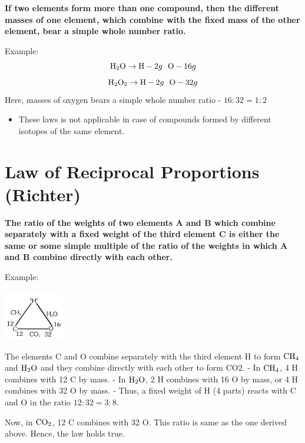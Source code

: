 \documentclass[
  14pt,
]{extarticle}
\providecommand{\tightlist}{%
  \setlength{\itemsep}{0pt}\setlength{\parskip}{0pt}}
\renewenvironment{quote}{\begin{myquote}}{\end{myquote}}
\begin{document}
\textbf{If two elements form more than one compound, then the different
masses of one element, which combine with the fixed mass of the other
element, bear a simple whole number ratio.}

Example: \[\ce{H2O} \rightarrow \mathrm{H} - 2g ~~ \mathrm{O} - 16g\]
\[\ce{H2O2}\rightarrow \mathrm{H} - 2g ~~ \mathrm{O} - 32g\] Here,
masses of oxygen bears a simple whole number ratio - \(16:32=1:2\)

\begin{quote}
\begin{itemize}
\tightlist
\item
  These laws is not applicable in case of compounds formed by different
  isotopes of the same element.
\end{itemize}
\end{quote}

\hypertarget{law-of-reciprocal-proportions-richter}{%
\section{Law of Reciprocal Proportions
(Richter)}\label{law-of-reciprocal-proportions-richter}}

\textbf{The ratio of the weights of two elements A and B which combine
separately with a fixed weight of the third element C is either the same
or some simple multiple of the ratio of the weights in which A and B
combine directly with each other.}

Example:

\begin{center}\includegraphics[width=1.04167in,height=\textheight]{./images/2022-06-22-23-05-22.png}\end{center}

The elements C and O combine separately with the third element H to form
\(\ce{CH4}\) and \(\ce{H2O}\) and they combine directly with each other
to form CO2. - In \(\ce{CH4}\), 4 H combines with 12 C by mass. - In
\(\ce{H2O}\), 2 H combines with 16 O by mass, or 4 H combines with 32 O
by mass. - Thus, a fixed weight of H (4 parts) reacts with C and O in
the ratio \(12:32=3:8\).

Now, in \(\ce{CO2}\), 12 C combines with 32 O. This ratio is same as the
one derived above. Hence, the law holds true.
\end{document}

